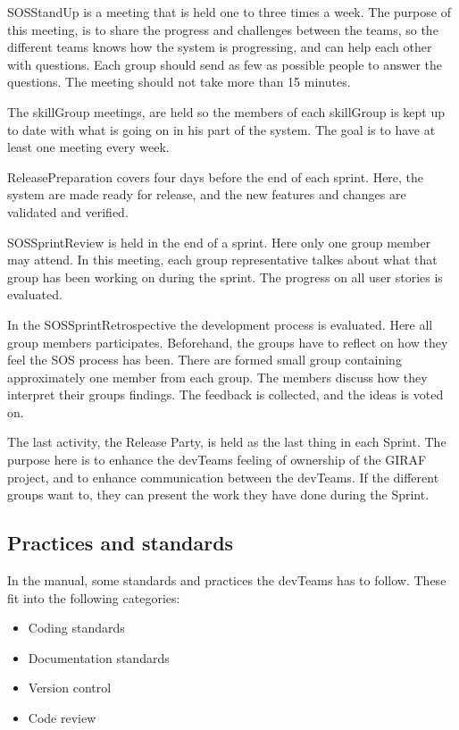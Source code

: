 \Gls{SOSStandUp} is a meeting that is held one to three times a week. The purpose of this meeting, is to share the progress and challenges between the teams, so the different teams knows how the system is progressing, and can help each other with questions. 
Each group should send as few as possible people to answer the questions. The meeting should not take more than 15 minutes. 

The \Gls{skillGroup} meetings, are held so the members of each \gls{skillGroup} is kept up to date with what is going on in his part of the system. The goal is to have at least one meeting every week. 

\Gls{ReleasePreparation} covers four days before the end of each sprint. Here, the system are made ready for release, and the new features and changes are validated and verified. 

\Gls{SOSSprintReview} is held in the end of a sprint. Here only one group member may attend. In this meeting, each group representative talkes about what that group has been working on during the sprint. The progress on all user stories is evaluated. 

In the \gls{SOSSprintRetrospective} the development process is evaluated. Here all group members participates. Beforehand, the groups have to reflect on how they feel the \gls{SOS} process has been. There are formed small group containing approximately one member from each group. The members discuss how they interpret their groups findings. The feedback is collected, and the ideas is voted on. 

The last activity, the Release Party, is held as the last thing in each Sprint. The purpose here is to enhance the \glspl{devTeam} feeling of ownership of the GIRAF project, and to enhance communication between the \glspl{devTeam}. If the different groups want to, they can present the work they have done during the Sprint.

\subsection*{Practices and standards} 
In the manual, some standards and practices the \glspl{devTeam} has to follow. These fit into the following categories:
\begin{itemize}
    \item Coding standards
    \item Documentation standards
    \item Version control
    \item Code review
\end{itemize}

